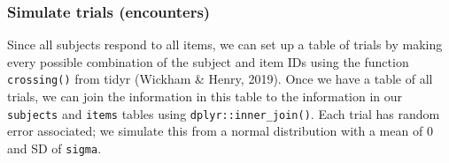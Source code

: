 \documentclass[doc,floatsintext]{apa6}
\newenvironment{Shaded}{\begin{snugshade}}{\end{snugshade}}
\newcommand{\KeywordTok}[1]{\textcolor[rgb]{0.13,0.29,0.53}{\textbf{#1}}}
\newcommand{\DataTypeTok}[1]{\textcolor[rgb]{0.13,0.29,0.53}{#1}}
\newcommand{\DecValTok}[1]{\textcolor[rgb]{0.00,0.00,0.81}{#1}}
\newcommand{\StringTok}[1]{\textcolor[rgb]{0.31,0.60,0.02}{#1}}
\newcommand{\CommentTok}[1]{\textcolor[rgb]{0.56,0.35,0.01}{\textit{#1}}}
\newcommand{\OperatorTok}[1]{\textcolor[rgb]{0.81,0.36,0.00}{\textbf{#1}}}
\newcommand{\NormalTok}[1]{#1}
\begin{document}
\subsubsection{Simulate trials
(encounters)}\label{simulate-trials-encounters}

Since all subjects respond to all items, we can set up a table of trials
by making every possible combination of the subject and item IDs using
the function \texttt{crossing()} from tidyr (Wickham \& Henry, 2019).
Once we have a table of all trials, we can join the information in this
table to the information in our \texttt{subjects} and \texttt{items}
tables using \texttt{dplyr::inner\_join()}. Each trial has random error
associated; we simulate this from a normal distribution with a mean of 0
and SD of \texttt{sigma}.

\begin{Shaded}
\end{Shaded}
\end{document}
